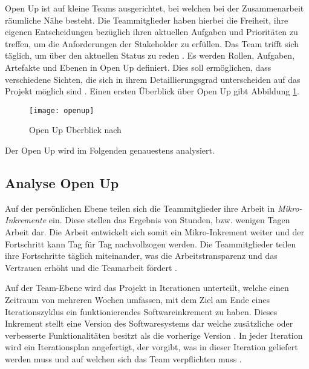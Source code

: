 Open Up ist auf kleine Teams ausgerichtet, bei welchen bei der Zusammenarbeit räumliche Nähe besteht. Die Teammitglieder haben hierbei die Freiheit, ihre eigenen Entscheidungen bezüglich ihren aktuellen Aufgaben und Prioritäten zu treffen, um die Anforderungen der Stakeholder zu erfüllen. Das Team trifft sich täglich, um über den aktuellen Status zu reden \cite{OpenUPProcess}.\newline
Es werden Rollen, Aufgaben, Artefakte und Ebenen in Open Up definiert. Dies soll ermöglichen, dass verschiedene Sichten, die sich in ihrem Detaillierungsgrad unterscheiden auf das Projekt möglich sind \cite{freudenreichevaluierung}. Einen ersten Überblick über Open Up gibt Abbildung \ref{fig:openup}.


\begin{figure}[htp]
\begin{center}
  \texttt{[image: openup]} %
  \caption{Open Up Überblick nach \cite{eclipseopenup}}
  \label{fig:openup}
\end{center}
\end{figure}

Der Open Up wird im Folgenden genauestens analysiert.

\subsection{Analyse Open Up}


Auf der persönlichen Ebene teilen sich die Teammitglieder ihre Arbeit in \textit{Mikro-Inkremente} ein. Diese stellen das Ergebnis von Stunden, bzw. wenigen Tagen Arbeit dar. Die Arbeit entwickelt sich somit ein Mikro-Inkrement weiter und der Fortschritt kann Tag für Tag nachvollzogen werden. Die Teammitglieder teilen ihre Fortschritte täglich miteinander, was die Arbeitstransparenz und das Vertrauen erhöht und die Teamarbeit fördert \cite{eclipseopenup}. \newline

Auf der Team-Ebene wird das Projekt in Iterationen unterteilt, welche einen Zeitraum von mehreren Wochen umfassen, mit dem Ziel am Ende eines Iterationszyklus ein funktionierendes Softwareinkrement zu haben. Dieses Inkrement stellt eine Version des Softwaresystems dar welche zusätzliche oder verbesserte Funktionalitäten besitzt als die vorherige Version \cite{Basem2010}.  In jeder Iteration wird ein Iterationsplan angefertigt,  der vorgibt, was in dieser Iteration geliefert werden muss und auf welchen sich das Team verpflichten muss \cite{freudenreichevaluierung}.

